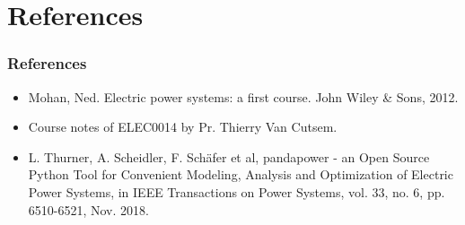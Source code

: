 \section{References}

\begin{frame}
    \frametitle{References}
    \begin{itemize}
        \item Mohan, Ned. Electric power systems: a first course. John Wiley \& Sons, 2012.
        \item Course notes of ELEC0014 by Pr. Thierry Van Cutsem.
        \item L. Thurner, A. Scheidler, F. Schäfer et al, pandapower - an Open Source Python Tool for Convenient Modeling, Analysis and Optimization of Electric Power Systems, in IEEE Transactions on Power Systems, vol. 33, no. 6, pp. 6510-6521, Nov. 2018.
    \end{itemize}
\end{frame}
